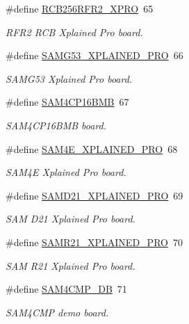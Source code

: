 \begin{DoxyCompactItemize}
\#define \mbox{\hyperlink{group__group__common__boards_gaa324bb83bce329ff03ab268e1e4b3576}{R\+C\+B256\+R\+F\+R2\+\_\+\+X\+P\+RO}}~65
\begin{DoxyCompactList}\small\item\em R\+F\+R2 R\+CB Xplained Pro board. \end{DoxyCompactList}\item 
\#define \mbox{\hyperlink{group__group__common__boards_ga78c5558dbccfc47964bebf2d988ca279}{S\+A\+M\+G53\+\_\+\+X\+P\+L\+A\+I\+N\+E\+D\+\_\+\+P\+RO}}~66
\begin{DoxyCompactList}\small\item\em S\+A\+M\+G53 Xplained Pro board. \end{DoxyCompactList}\item 
\#define \mbox{\hyperlink{group__group__common__boards_gaadd6f8293afefe2f5eb738501405c12a}{S\+A\+M4\+C\+P16\+B\+MB}}~67
\begin{DoxyCompactList}\small\item\em S\+A\+M4\+C\+P16\+B\+MB board. \end{DoxyCompactList}\item 
\#define \mbox{\hyperlink{group__group__common__boards_ga1d82861141cc7f20cb7dbfbc4c63a392}{S\+A\+M4\+E\+\_\+\+X\+P\+L\+A\+I\+N\+E\+D\+\_\+\+P\+RO}}~68
\begin{DoxyCompactList}\small\item\em S\+A\+M4E Xplained Pro board. \end{DoxyCompactList}\item 
\#define \mbox{\hyperlink{group__group__common__boards_ga2fb71beea93310d02b49bc36c0fefefa}{S\+A\+M\+D21\+\_\+\+X\+P\+L\+A\+I\+N\+E\+D\+\_\+\+P\+RO}}~69
\begin{DoxyCompactList}\small\item\em S\+AM D21 Xplained Pro board. \end{DoxyCompactList}\item 
\#define \mbox{\hyperlink{group__group__common__boards_gadf512fad325a471f71964e4ff5d207a7}{S\+A\+M\+R21\+\_\+\+X\+P\+L\+A\+I\+N\+E\+D\+\_\+\+P\+RO}}~70
\begin{DoxyCompactList}\small\item\em S\+AM R21 Xplained Pro board. \end{DoxyCompactList}\item 
\#define \mbox{\hyperlink{group__group__common__boards_gaac61c4e9332d11d13603b99e28f32a54}{S\+A\+M4\+C\+M\+P\+\_\+\+DB}}~71
\begin{DoxyCompactList}\small\item\em S\+A\+M4\+C\+MP demo board. \end{DoxyCompactList}\item 

\end{DoxyCompactItemize}
